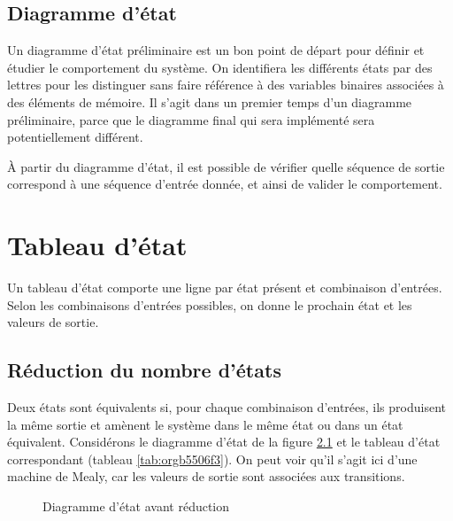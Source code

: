 \documentclass[letter, oneside]{book}
\begin{document}
\section{Diagramme d'état}
\label{sec:orgb50a07a}

Un diagramme d'état préliminaire est un bon point de départ pour
définir et étudier le comportement du système. On identifiera les
différents états par des lettres pour les distinguer sans faire
référence à des variables binaires associées à des éléments de
mémoire. Il s'agit dans un premier temps d'un diagramme préliminaire,
parce que le diagramme final qui sera implémenté sera potentiellement
différent.

À partir du diagramme d'état, il est possible de vérifier quelle
séquence de sortie correspond à une séquence d'entrée donnée, et ainsi
de valider le comportement.

\chapter{Tableau d'état}
\label{sec:org9872e2a}

Un tableau d'état comporte une ligne par état présent et combinaison
d'entrées. Selon les combinaisons d'entrées possibles, on donne le
prochain état et les valeurs de sortie.

\section{Réduction du nombre d'états}
\label{sec:orga2bfa92}

Deux états sont équivalents si, pour chaque combinaison d'entrées, ils
produisent la même sortie et amènent le système dans le même état ou
dans un état équivalent. Considérons le diagramme d'état de la figure
\ref{fig:org3f98a9a} et le tableau d'état correspondant (tableau 
\ref{tab:orgb5506f3}). On peut voir qu'il s'agit ici d'une machine de
Mealy, car les valeurs de sortie sont associées aux transitions.


\begin{figure}[htbp]
\centering

\caption{\label{fig:org3f98a9a}Diagramme d'état avant réduction}
\end{figure}
\end{document}
